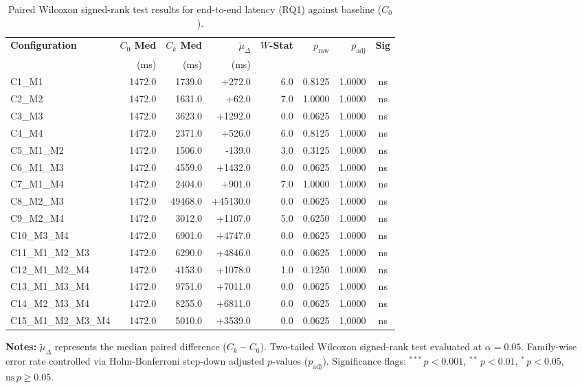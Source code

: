 \begin{table}[!htbp]
\centering
\small
\caption{Paired Wilcoxon signed-rank test results for end-to-end latency (RQ1) against baseline ($C_0$).}
\label{tab:wilcoxon_rq1}
\begin{tabular*}{\textwidth}{@{\extracolsep{\fill}} l r r r r r r c @{}}
\toprule
\textbf{Configuration} & \textbf{$C_0$ Med} & \textbf{$C_k$ Med} & \textbf{$\tilde{\mu}_\Delta$} & \textbf{$W$-Stat} & \textbf{$p_{\text{raw}}$} & \textbf{$p_{\text{adj}}$} & \textbf{Sig} \\
 & \scriptsize{(ms)} & \scriptsize{(ms)} & \scriptsize{(ms)} & & & & \\
\midrule
C1\_M1 & 1472.0 & 1739.0 & +272.0 & 6.0 & 0.8125 & 1.0000 & ns \\
C2\_M2 & 1472.0 & 1631.0 & +62.0 & 7.0 & 1.0000 & 1.0000 & ns \\
C3\_M3 & 1472.0 & 3623.0 & +1292.0 & 0.0 & 0.0625 & 1.0000 & ns \\
C4\_M4 & 1472.0 & 2371.0 & +526.0 & 6.0 & 0.8125 & 1.0000 & ns \\
C5\_M1\_M2 & 1472.0 & 1506.0 & -139.0 & 3.0 & 0.3125 & 1.0000 & ns \\
C6\_M1\_M3 & 1472.0 & 4559.0 & +1432.0 & 0.0 & 0.0625 & 1.0000 & ns \\
C7\_M1\_M4 & 1472.0 & 2404.0 & +901.0 & 7.0 & 1.0000 & 1.0000 & ns \\
C8\_M2\_M3 & 1472.0 & 49468.0 & +45130.0 & 0.0 & 0.0625 & 1.0000 & ns \\
C9\_M2\_M4 & 1472.0 & 3012.0 & +1107.0 & 5.0 & 0.6250 & 1.0000 & ns \\
C10\_M3\_M4 & 1472.0 & 6901.0 & +4747.0 & 0.0 & 0.0625 & 1.0000 & ns \\
C11\_M1\_M2\_M3 & 1472.0 & 6290.0 & +4846.0 & 0.0 & 0.0625 & 1.0000 & ns \\
C12\_M1\_M2\_M4 & 1472.0 & 4153.0 & +1078.0 & 1.0 & 0.1250 & 1.0000 & ns \\
C13\_M1\_M3\_M4 & 1472.0 & 9751.0 & +7011.0 & 0.0 & 0.0625 & 1.0000 & ns \\
C14\_M2\_M3\_M4 & 1472.0 & 8255.0 & +6811.0 & 0.0 & 0.0625 & 1.0000 & ns \\
C15\_M1\_M2\_M3\_M4 & 1472.0 & 5010.0 & +3539.0 & 0.0 & 0.0625 & 1.0000 & ns \\
\bottomrule
\end{tabular*}
\vspace{0.5em}
\parbox{\textwidth}{\footnotesize
\textbf{Notes:} $\tilde{\mu}_\Delta$ represents the median paired difference ($C_k - C_0$). Two-tailed Wilcoxon signed-rank test evaluated at $\alpha = 0.05$. Family-wise error rate controlled via Holm-Bonferroni step-down adjusted $p$-values ($p_{\text{adj}}$). Significance flags: $^{***}\,p < 0.001$, $^{**}\,p < 0.01$, $^{*}\,p < 0.05$, $\text{ns}\,p \ge 0.05$.}
\end{table}
